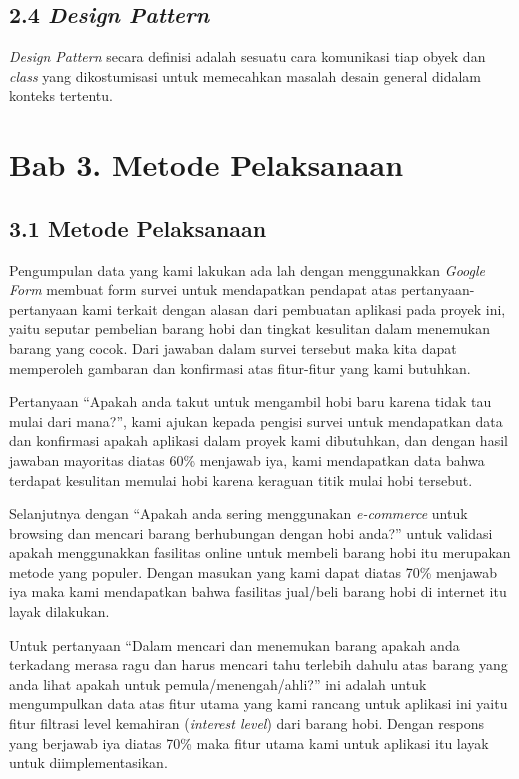 \documentclass[a4paper]{article}
\begin{document}
\subsection*{2.4 \textit{Design Pattern}}

\textit{Design Pattern} secara definisi adalah sesuatu cara komunikasi tiap obyek dan \textit{class} yang dikostumisasi untuk memecahkan masalah desain general didalam konteks tertentu\autocite{design-pattern-2588942}.

\newpage
\section*{Bab 3. Metode Pelaksanaan}
\subsection*{3.1 Metode Pelaksanaan}


Pengumpulan data yang kami lakukan ada lah dengan menggunakkan \textit{Google Form} membuat form survei untuk mendapatkan pendapat atas pertanyaan-pertanyaan kami terkait dengan alasan dari pembuatan aplikasi pada proyek ini, yaitu seputar pembelian barang hobi dan tingkat kesulitan dalam menemukan barang yang cocok. Dari jawaban dalam survei tersebut maka kita dapat memperoleh gambaran dan konfirmasi atas fitur-fitur yang kami butuhkan.


Pertanyaan “Apakah anda takut untuk mengambil hobi baru karena tidak tau mulai dari mana?”, kami ajukan kepada pengisi survei untuk mendapatkan data dan konfirmasi apakah aplikasi dalam proyek kami dibutuhkan, dan dengan hasil jawaban mayoritas diatas 60\% menjawab iya, kami mendapatkan data bahwa terdapat kesulitan memulai hobi karena keraguan titik mulai hobi tersebut.


Selanjutnya dengan “Apakah anda sering menggunakan \textit{e-commerce} untuk browsing dan mencari barang berhubungan dengan hobi anda?” untuk validasi apakah menggunakkan fasilitas online untuk membeli barang hobi itu merupakan metode yang populer. Dengan masukan yang kami dapat diatas 70\% menjawab iya maka kami mendapatkan bahwa fasilitas jual/beli barang hobi di internet itu layak dilakukan.


Untuk pertanyaan “Dalam mencari dan menemukan barang apakah anda terkadang merasa ragu dan harus mencari tahu terlebih dahulu atas barang yang anda lihat apakah untuk pemula/menengah/ahli?” ini adalah untuk mengumpulkan data atas fitur utama yang kami rancang untuk aplikasi ini yaitu fitur filtrasi level kemahiran (\textit{interest level}) dari barang hobi. Dengan respons yang berjawab iya diatas 70\% maka fitur utama kami untuk aplikasi itu layak untuk diimplementasikan.
\end{document}
